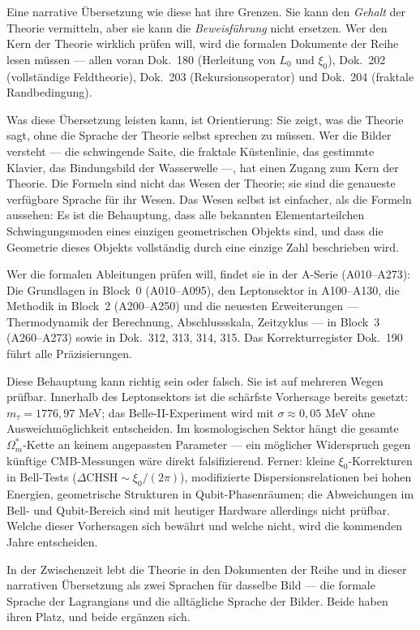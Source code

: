 Eine narrative Übersetzung wie diese hat ihre Grenzen. Sie kann den
\emph{Gehalt} der Theorie vermitteln, aber sie kann die
\emph{Beweisführung} nicht ersetzen. Wer den Kern der Theorie wirklich
prüfen will, wird die formalen Dokumente der Reihe lesen müssen ---
allen voran Dok.~180 (Herleitung von $L_0$ und $\xi_0$), Dok.~202
(vollständige Feldtheorie), Dok.~203 (Rekursionsoperator) und
Dok.~204 (fraktale Randbedingung).

Was diese Übersetzung leisten kann, ist Orientierung: Sie zeigt, was
die Theorie sagt, ohne die Sprache der Theorie selbst sprechen zu
müssen. Wer die Bilder versteht --- die schwingende Saite, die
fraktale Küstenlinie, das gestimmte Klavier, das Bindungsbild der
Wasserwelle ---, hat einen Zugang zum Kern der Theorie. Die Formeln
sind nicht das Wesen der Theorie; sie sind die genaueste verfügbare
Sprache für ihr Wesen. Das Wesen selbst ist einfacher, als die
Formeln aussehen: Es ist die Behauptung, dass alle bekannten
Elementarteilchen Schwingungsmoden eines einzigen geometrischen
Objekts sind, und dass die Geometrie dieses Objekts vollständig
durch eine einzige Zahl beschrieben wird.

Wer die formalen Ableitungen prüfen will, findet sie in der A-Serie
(A010--A273): Die Grundlagen in Block~0 (A010--A095), den
Leptonsektor in A100--A130, die Methodik in Block~2 (A200--A250)
und die neuesten Erweiterungen --- Thermodynamik der Berechnung,
Abschlussskala, Zeitzyklus --- in Block~3 (A260--A273) sowie
in Dok.~312, 313, 314, 315. Das Korrekturregister Dok.~190 führt
alle Präzisierungen.

Diese Behauptung kann richtig sein oder falsch. Sie ist auf
mehreren Wegen prüfbar. Innerhalb des Leptonsektors ist die
schärfste Vorhersage bereits gesetzt: $m_\tau = 1776{,}97$ MeV;
das Belle-II-Experiment wird mit $\sigma \approx 0{,}05$ MeV
ohne Ausweichmöglichkeit entscheiden. Im kosmologischen Sektor
hängt die gesamte $\Omega_m^*$-Kette an keinem angepassten
Parameter --- ein möglicher Widerspruch gegen künftige
CMB-Messungen wäre direkt falsifizierend. Ferner: kleine
$\xi_0$-Korrekturen in Bell-Tests ($\Delta\mathrm{CHSH} \sim \xi_0/(2\pi)$),
modifizierte Dispersionsrelationen bei hohen Energien,
geometrische Strukturen in Qubit-Phasenräumen; die Abweichungen im
Bell- und Qubit-Bereich sind mit heutiger Hardware allerdings nicht
prüfbar. Welche dieser Vorhersagen sich bewährt und welche nicht,
wird die kommenden Jahre entscheiden.

In der Zwischenzeit lebt die Theorie in den Dokumenten der Reihe
und in dieser narrativen Übersetzung als zwei Sprachen für dasselbe
Bild --- die formale Sprache der Lagrangians und die alltägliche
Sprache der Bilder. Beide haben ihren Platz, und beide ergänzen
sich.
